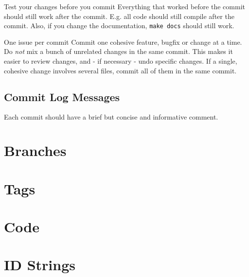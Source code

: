 \begin{guideline*}{Test your changes before you commit}
  Everything that worked before the commit should still work after the commit.
  E.g. all code should still compile after the commit. Also, if you change
  the documentation, {\tt make docs} should still work.
\end{guideline*}

\begin{guideline*}{One issue per commit}
  Commit one cohesive feature, bugfix or change at a time. Do \emph{not}
  mix a bunch of unrelated changes in the same commit.
  This makes it easier to review changes, and - if necessary - undo specific
  changes.
  If a single, cohesive change involves several files, commit all of them
  in the same commit.
\end{guideline*}


\subsection{Commit Log Messages}
\label{sec:commit-log-messages}

Each commit should have a brief but concise and informative comment.


\section{Branches}
\label{sec:branches}

\section{Tags}
\label{sec:tags}

\section{Code}
\label{sec:code}

\section{ID Strings}
\label{sec:id-strings}


